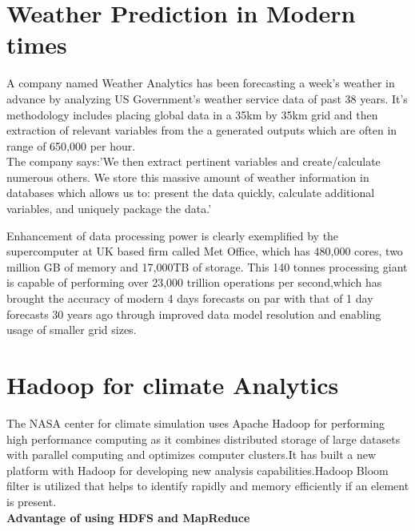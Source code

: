 \documentclass[sigconf]{acmart}
\begin{document}
\section{Weather Prediction in Modern times}

A company named Weather Analytics has been forecasting a week's weather in advance by analyzing US Government's weather service data of past 38 years. It's methodology includes placing global data in a 35km by 35km grid and then extraction of relevant variables from the a generated outputs which are often in range of 650,000 per hour.\\

The company says:'We then extract pertinent variables and create/calculate numerous others. We store this massive amount of weather information in databases which allows us to: present the data quickly, calculate additional variables, and uniquely package the data.'\\\cite{Zdnet}

Enhancement of data processing power is clearly exemplified by the supercomputer at UK based firm called Met Office, which has 480,000 cores, two million GB of memory and 17,000TB of storage. This 140 tonnes processing giant is capable of performing over 23,000 trillion operations per second,which has brought the accuracy of modern 4 days forecasts on par with that of 1 day forecasts 30 years ago through improved data model resolution and enabling usage of smaller grid sizes.\cite{Zdnet}

\section{Hadoop for climate Analytics}

The NASA center for climate simulation uses Apache Hadoop for performing high performance computing as it combines distributed storage of large datasets with parallel computing and optimizes computer clusters.It has built a new platform with Hadoop for developing new analysis capabilities.Hadoop Bloom filter is utilized that helps to identify rapidly and memory efficiently if an element is present.\\


\textbf{Advantage of using HDFS and MapReduce}
\end{document}
